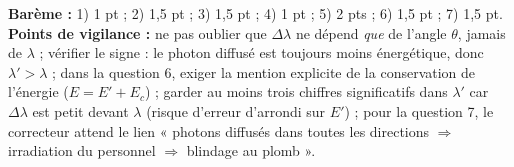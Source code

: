 \documentclass[11pt]{article}
\begin{document}
\begin{attention}
\textbf{Barème :} 1) 1 pt ; 2) 1,5 pt ; 3) 1,5 pt ; 4) 1 pt ; 5) 2 pts ; 6) 1,5 pt ; 7) 1,5 pt.
\textbf{Points de vigilance :} ne pas oublier que $\Delta\lambda$ ne dépend \emph{que} de l'angle $\theta$, jamais de $\lambda$ ; vérifier le signe : le photon diffusé est toujours moins énergétique, donc $\lambda' > \lambda$ ; dans la question 6, exiger la mention explicite de la conservation de l'énergie ($E = E' + E_c$) ; garder au moins trois chiffres significatifs dans $\lambda'$ car $\Delta\lambda$ est petit devant $\lambda$ (risque d'erreur d'arrondi sur $E'$) ; pour la question 7, le correcteur attend le lien « photons diffusés dans toutes les directions $\Rightarrow$ irradiation du personnel $\Rightarrow$ blindage au plomb ».
\end{attention}
\end{document}
